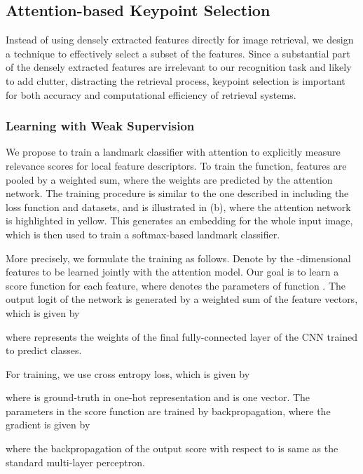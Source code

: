 \documentclass[10pt,twocolumn,letterpaper]{article}
\begin{document}
\subsection{Attention-based Keypoint Selection} \label{subsec:attention}

Instead of using densely extracted features directly for image retrieval, we design a technique to effectively select a subset of the features.
Since a substantial part of the densely extracted features are irrelevant to our recognition task and likely to add clutter, distracting the retrieval process, keypoint selection is important for both accuracy and computational efficiency of retrieval systems.




\subsubsection{Learning with Weak Supervision}

We propose to train a landmark classifier with attention to explicitly measure relevance scores for local feature descriptors.
To train the function, features are pooled by a weighted sum, where the weights are predicted by the attention network.
The training procedure is similar to the one described in  including the loss function and datasets, and is illustrated in (b), where the attention network is highlighted in yellow.
This generates an embedding for the whole input image, which is then used to train a softmax-based landmark classifier.

More precisely, we formulate the training as follows.
Denote by  the -dimensional features to be learned jointly with the attention model.
Our goal is to learn a score function  for each feature, where  denotes the parameters of function .
The output logit  of the network is generated by a weighted sum of the feature vectors, which is given by

where  represents the weights of the final fully-connected layer 
of the CNN trained to predict  classes.

For training, we use cross entropy loss, which is given by

where  is ground-truth in one-hot representation and  is one vector.
The parameters in the score function  are trained by backpropagation, where the gradient is given by

where the backpropagation of the output score  with respect to  is same as the standard multi-layer perceptron.
\end{document}
